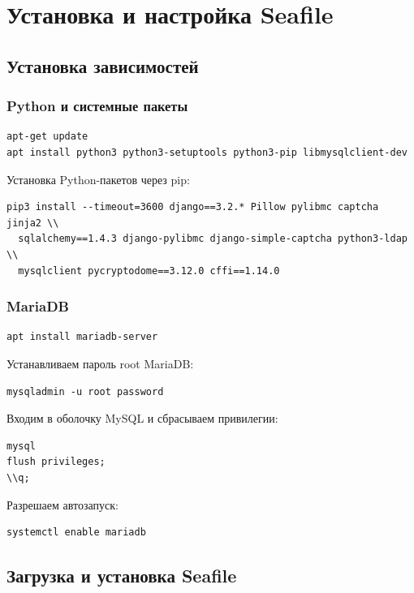 \chapter{Установка и настройка Seafile}
\label{ch:practice}

\section{Установка зависимостей}

\subsection{Python и системные пакеты}

\begin{lstlisting}
apt-get update
apt install python3 python3-setuptools python3-pip libmysqlclient-dev
\end{lstlisting}

Установка Python-пакетов через pip:
\begin{lstlisting}
pip3 install --timeout=3600 django==3.2.* Pillow pylibmc captcha jinja2 \\
  sqlalchemy==1.4.3 django-pylibmc django-simple-captcha python3-ldap \\
  mysqlclient pycryptodome==3.12.0 cffi==1.14.0
\end{lstlisting}

\subsection{MariaDB}

\begin{lstlisting}
apt install mariadb-server
\end{lstlisting}

Устанавливаем пароль root MariaDB:
\begin{lstlisting}
mysqladmin -u root password
\end{lstlisting}

Входим в оболочку MySQL и сбрасываем привилегии:
\begin{lstlisting}
mysql
flush privileges;
\\q;
\end{lstlisting}

Разрешаем автозапуск:
\begin{lstlisting}
systemctl enable mariadb
\end{lstlisting}

\section{Загрузка и установка Seafile}

